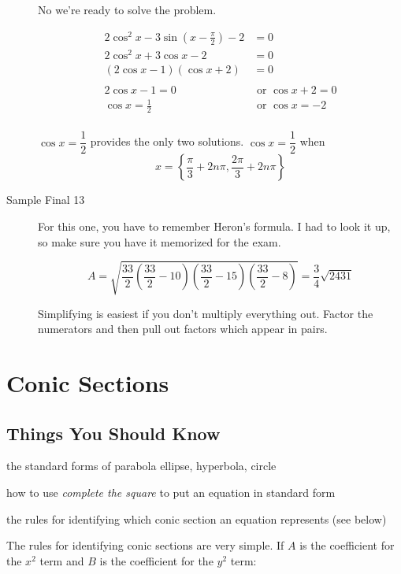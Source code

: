 \documentclass[fleqn,addpoints]{exam}
\begin{document}
\begin{description}
No we're ready to solve the problem.

\begin{align*}
  2 \cos^2 x - 3 \sin \left(x - \frac{\pi}{2} \right) - 2 &= 0 \\
  2 \cos^2 x + 3 \cos x - 2 &= 0 \\
  (2\cos x - 1)(\cos x + 2) &= 0 \\
  \\
  2 \cos x - 1 = 0     & \text{ or } \cos x + 2 = 0 \\
  \cos x = \frac{1}{2} & \text{ or } \cos x = -2 \\
\end{align*}

$\cos x = \dfrac{1}{2}$ provides the only two solutions.  $\cos x = \dfrac{1}{2}$ when 
\[
  x = \left\{ \frac{\pi}{3} + 2 n \pi, \frac{2 \pi}{3} + 2 n \pi \right\}
\]

\item[Sample Final 13]
For this one, you have to remember Heron's formula.  I had to look it up, so make sure you have it memorized for the
exam.

\[
  A = \sqrt{ \frac{33}{2} \left(\frac{33}{2} - 10 \right) \left(\frac{33}{2} - 15 \right) \left(\frac{33}{2} - 8 \right)}
  = \frac{3}{4}\sqrt{2431}
\]

Simplifying is easiest if you don't multiply everything out.  Factor the numerators and then pull out factors which
appear in pairs.

\end{description}
\section{Conic Sections}

\subsection{Things You Should Know}
\begin{itemize*}
  \item the standard forms of parabola ellipse, hyperbola, circle
  \item how to use {\em complete the square} to put an equation in standard form
  \item the rules for identifying which conic section an equation represents (see below)
\end{itemize*}

The rules for identifying conic sections are very simple.  If $A$ is the coefficient for the $x^2$ term and $B$ is the
coefficient for the $y^2$ term:
\end{document}
